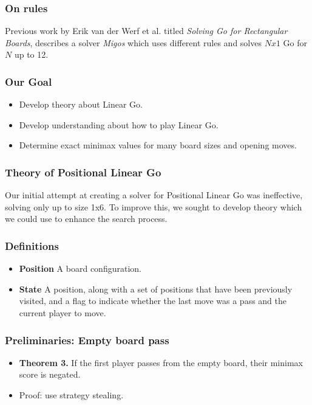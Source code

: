 \documentclass{beamer}
\begin{document}
    \begin{frame}
        \frametitle{On rules}
        Previous work by Erik van der Werf et al. titled \textit{Solving Go for Rectangular Boards},
        describes a solver \textit{Migos} which uses different rules
        and solves $Nx1$ Go for $N$ up to 12.
    \end{frame}

    \begin{frame}
        \frametitle{Our Goal}
        \begin{itemize}[<+->]
            \item Develop theory about Linear Go.
            \item Develop understanding about how to play Linear Go.
            \item Determine exact minimax values for many board sizes and opening moves.
        \end{itemize}
    \end{frame}

    \begin{frame}
        \frametitle{Theory of Positional Linear Go}
        Our initial attempt at creating a solver for Positional Linear Go was ineffective, solving only
        up to size 1x6. To improve this, we sought to develop theory which we could use to enhance the
        search process.
    \end{frame}

    \begin{frame}
        \frametitle{Definitions}
        \begin{itemize}
            \item \textbf{Position} A board configuration.
            \item \textbf{State} A position, along with a set of positions that have been previously visited, and a flag to indicate whether the last move was a pass and the current player to move.
        \end{itemize}
    \end{frame}

    \begin{frame}
        \frametitle{Preliminaries: Empty board pass}
        \begin{itemize}
            \item \textbf{Theorem 3.} If the first player passes from the empty board, their minimax score is negated.
            \item Proof: use strategy stealing.
        \end{itemize}
    \end{frame}
\end{document}
